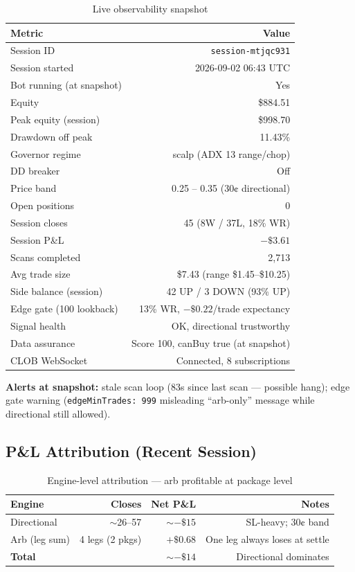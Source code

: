 \documentclass[11pt,a4paper]{article}
\begin{document}
\begin{table}[h]
\centering
\begin{tabular}{@{}lr@{}}
\toprule
\textbf{Metric} & \textbf{Value} \\
\midrule
Session ID & \texttt{session-mtjqc931} \\
Session started & 2026-09-02 06:43 UTC \\
Bot running (at snapshot) & Yes \\
Equity & \$884.51 \\
Peak equity (session) & \$998.70 \\
Drawdown off peak & 11.43\% \\
Governor regime & scalp (ADX 13 range/chop) \\
DD breaker & Off \\
Price band & 0.25 -- 0.35 (30¢ directional) \\
Open positions & 0 \\
Session closes & 45 (8W / 37L, 18\% WR) \\
Session P\&L & $-\$3.61$ \\
Scans completed & 2{,}713 \\
Avg trade size & \$7.43 (range \$1.45--\$10.25) \\
Side balance (session) & 42 UP / 3 DOWN (93\% UP) \\
Edge gate (100 lookback) & 13\% WR, $-\$0.22$/trade expectancy \\
Signal health & OK, directional trustworthy \\
Data assurance & Score 100, canBuy true (at snapshot) \\
CLOB WebSocket & Connected, 8 subscriptions \\
\bottomrule
\end{tabular}
\caption{Live observability snapshot}
\end{table}

\noindent\textbf{Alerts at snapshot:} stale scan loop (83s since last scan --- possible hang); edge gate warning (\texttt{edgeMinTrades: 999} misleading ``arb-only'' message while directional still allowed).

\subsection{P\&L Attribution (Recent Session)}
\begin{table}[h]
\centering
\begin{tabular}{@{}lrrr@{}}
\toprule
\textbf{Engine} & \textbf{Closes} & \textbf{Net P\&L} & \textbf{Notes} \\
\midrule
Directional & $\sim$26--57 & $\sim -\$15$ & SL-heavy; 30¢ band \\
Arb (leg sum) & 4 legs (2 pkgs) & $+\$0.68$ & One leg always loses at settle \\
\midrule
\textbf{Total} & & \textbf{$\sim -\$14$} & Directional dominates \\
\bottomrule
\end{tabular}
\caption{Engine-level attribution --- arb profitable at package level}
\end{table}
\end{document}
